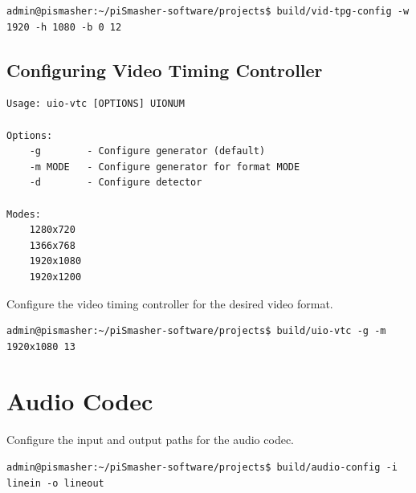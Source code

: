\documentclass[sfsidenotes, justified]{tufte-handout}
\begin{document}
\begin{lstlisting}
admin@pismasher:~/piSmasher-software/projects$ build/vid-tpg-config -w 1920 -h 1080 -b 0 12
\end{lstlisting}


	\subsection{Configuring Video Timing Controller}

	\begin{lstlisting}[style=text]
Usage: uio-vtc [OPTIONS] UIONUM

Options:
    -g        - Configure generator (default)
    -m MODE   - Configure generator for format MODE
    -d        - Configure detector

Modes:
    1280x720
    1366x768
    1920x1080
    1920x1200
	\end{lstlisting}

	Configure the video timing controller for the desired video format.
	
\begin{lstlisting}
admin@pismasher:~/piSmasher-software/projects$ build/uio-vtc -g -m 1920x1080 13
\end{lstlisting}

\section{Audio Codec}


Configure the input and output paths for the audio codec.

\begin{lstlisting}
admin@pismasher:~/piSmasher-software/projects$ build/audio-config -i linein -o lineout
\end{lstlisting}


    
\end{document}
